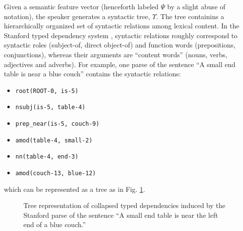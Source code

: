 \documentclass[12pt]{article}
\begin{document}
Given a semantic feature vector (henceforth labeled $\Psi$ by a slight abuse of notation), the speaker generates a syntactic tree, $\Upsilon$.  The tree containins a hierarchically organized set of syntactic relations among lexical content.  In the Stanford typed dependency system \citep{mcdm08b}, syntactic relations roughly correspond to syntactic roles (subject-of, direct object-of) and function words (prepositions, conjunctions), whereas their arguments are ``content words'' (nouns, verbs, adjectives and adverbs).  For example, one parse of the sentence ``A small end table is near a blue couch'' contains the syntactic relations:
\begin{itemize}
\item {\tt root(ROOT-0, is-5)}
\item {\tt nsubj(is-5, table-4)}
\item {\tt prep\_near(is-5, couch-9)}
\item {\tt amod(table-4, small-2)}
\item {\tt nn(table-4, end-3)}
\item {\tt amod(couch-13, blue-12)}
\end{itemize}
which can be represented as a tree as in Fig. \ref{fig:typed-dependency-tree}.
\begin{figure}[t]
\begin{center}
\end{center}
\caption{Tree representation of collapsed typed dependencies induced by the Stanford parse of the sentence ``A small end table is near the left end of a blue couch.''} \label{fig:typed-dependency-tree}
\end{figure}
\end{document}
